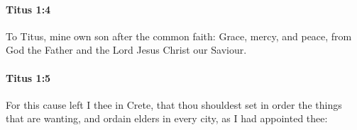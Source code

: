 		\paragraph{Titus 1:4} %
			\label{TITUS-1-4}

			To Titus, mine own son after the common faith: Grace, mercy, and peace, from God the Father and the Lord Jesus Christ our Saviour.

			\begin{framed}
			\scriptsize
				\begin{compactdesc}
					\item[SBLG] 
				\end{compactdesc}
			\end{framed}

		\paragraph{Titus 1:5} %
			\label{TITUS-1-5}

			For this cause left I thee in Crete, that thou shouldest set in order the things that are wanting, and ordain elders in every city, as I had appointed thee:

